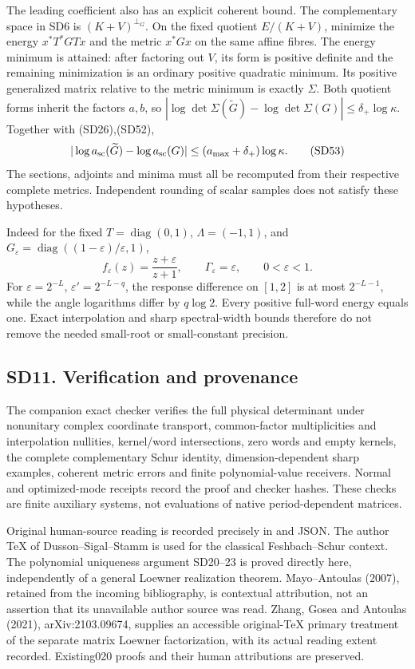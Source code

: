 \documentclass[11pt]{article}
\begin{document}
The leading coefficient also has an explicit coherent bound. The complementary space in SD6 is \((K+V)^{\perp_G}\). On the fixed quotient \(E/(K+V)\), minimize the energy \(x^*T^*GT x\) and the metric \(x^*Gx\) on the same affine fibres. The energy minimum is attained: after factoring out \(V\), its form is positive definite and the remaining minimization is an ordinary positive quadratic minimum. Its positive generalized matrix relative to the metric minimum is exactly \(\Sigma\). Both quotient forms inherit the factors \(a,b\), so \(|\log\det\Sigma(\widetilde G)-\log\det\Sigma(G)|\le\delta_+\log\kappa\). Together with (SD26),(SD52), \[
|\log a_{\rm sc}(\widetilde G)-\log a_{\rm sc}(G)|
\le(a_{\max}+\delta_+)\log\kappa.
\tag{SD53}
\] The sections, adjoints and minima must all be recomputed from their respective complete metrics. Independent rounding of scalar samples does not satisfy these hypotheses.

Indeed for the fixed \(T=\operatorname{diag}(0,1)\), \(\Lambda=(-1,1)\), and \(G_\varepsilon=\operatorname{diag}((1-\varepsilon)/\varepsilon,1)\), \[
f_\varepsilon(z)=\frac{z+\varepsilon}{z+1},\qquad
\Gamma_\varepsilon=\varepsilon,\qquad0<\varepsilon<1.
\tag{SD54}
\] For \(\varepsilon=2^{-L}\), \(\varepsilon'=2^{-L-q}\), the response difference on \([1,2]\) is at most \(2^{-L-1}\), while the angle logarithms differ by \(q\log2\). Every positive full-word energy equals one. Exact interpolation and sharp spectral-width bounds therefore do not remove the needed small-root or small-constant precision.

\subsection{SD11. Verification and provenance}\label{sd11.-verification-and-provenance}

The companion exact checker verifies the full physical determinant under nonunitary complex coordinate transport, common-factor multiplicities and interpolation nullities, kernel/word intersections, zero words and empty kernels, the complete complementary Schur identity, dimension-dependent sharp examples, coherent metric errors and finite polynomial-value receivers. Normal and optimized-mode receipts record the proof and checker hashes. These checks are finite auxiliary systems, not evaluations of native period-dependent matrices.

Original human-source reading is recorded precisely in  and JSON. The author TeX of Dusson--Sigal--Stamm is used for the classical Feshbach--Schur context. The polynomial uniqueness argument SD20--23 is proved directly here, independently of a general Loewner realization theorem. Mayo--Antoulas (2007), retained from the incoming bibliography, is contextual attribution, not an assertion that its unavailable author source was read. Zhang, Gosea and Antoulas (2021), arXiv:2103.09674, supplies an accessible original-TeX primary treatment of the separate matrix Loewner factorization, with its actual reading extent recorded. Existing020 proofs and their human attributions are preserved.
\end{document}
